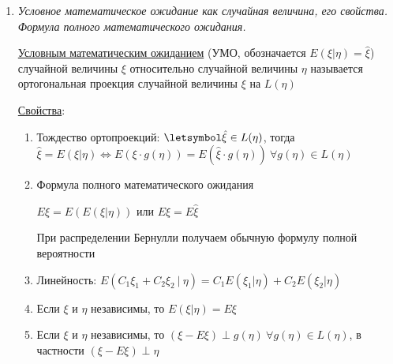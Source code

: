 \begin{enumerate}
    \hyperlink{scalarproductoftwovariables}{Скалярным произведением} случайных величин $\xi$ и $\eta$ из $L_2(\Omega, \mathcal{F}, P)$ 
    называется число $(\xi, \eta) = E(\xi\eta)$

    \hyperlink{cauchybunyakovskyschwarzinequality}{Неравенство Коши-Буняковского-Шварца}: \Ths Пусть случайные величины $\xi$ и $\eta$ имеют конечный второй момент, тогда 
    $|E(\xi, \eta)| \leq \sqrt{E\xi^2 \cdot E\eta^2}$ (или $|(\xi, \eta)| \leq \|\xi\|\cdot\|\eta\|$)

    Причем $|E(\xi, \eta)| = \sqrt{E\xi^2 \cdot E\eta^2} \Longleftrightarrow \eta = C\xi$, где $C = \mathrm{const}$

    \item \textit{Условное математическое ожидание как случайная величина, его свойства. Формула полного математического ожидания.}

    \hyperlink{conditionalexpectedvalue}{Условным математическим ожиданием} (УМО, обозначается $E(\xi|\eta) = \hat{\xi}$) случайной величины $\xi$
    относительно случайной величины $\eta$ называется ортогональная проекция случайной величины $\xi$ на $L(\eta)$ 
    
    \hyperlink{conditionalexpectedvalueproperties}{Свойства}:

    \begin{enumerate}
        \item Тождество ортопроекций: $\letsymbol \hat{\xi} \in L(\eta)$, тогда $\hat{\xi} = E(\xi|\eta) \Longleftrightarrow E(\xi\cdot g(\eta)) = E(\hat{\xi}\cdot g(\eta)) \ \forall g(\eta) \in L(\eta)$

        \item Формула полного математического ожидания

        $E\xi = E(E(\xi|\eta))$ или $E\xi = E\hat{\xi}$

        \Nota При распределении Бернулли получаем обычную формулу полной вероятности

        \item Линейность: $E(C_1\xi_1 + C_2\xi_2 \ | \ \eta) = C_1 E(\xi_1|\eta) + C_2 E(\xi_2|\eta)$

        \item Если $\xi$ и $\eta$ независимы, то $E(\xi|\eta) = E\xi$

        \item Если $\xi$ и $\eta$ независимы, то $(\xi - E\xi) \perp g(\eta) \ \forall g(\eta) \in L(\eta)$, 
        в частности $(\xi - E\xi) \perp \eta$
    \end{enumerate}


\end{enumerate}
